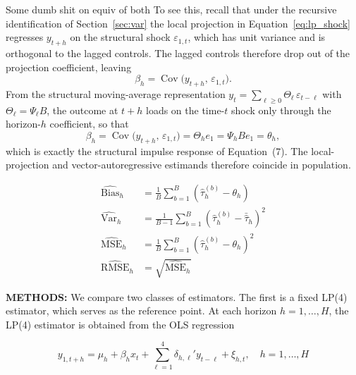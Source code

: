 Some dumb shit on equiv of both
To see this, recall that under the recursive identification of 
Section~\ref{sec:var} the local projection in Equation~\eqref{eq:lp_shock} regresses 
$y_{t+h}$ on the structural shock $\varepsilon_{1,t}$, which has unit variance and is 
orthogonal to the lagged controls. The lagged controls therefore drop out of the 
projection coefficient, leaving
\begin{equation}
\beta_h = \operatorname{Cov}\!\big(y_{t+h},\, \varepsilon_{1,t}\big).
\end{equation}
From the structural moving-average representation 
$y_t = \sum_{\ell \geq 0}\Theta_\ell\,\varepsilon_{t-\ell}$ with 
$\Theta_\ell = \Psi_\ell B$, the outcome at $t+h$ loads on the time-$t$ shock only 
through the horizon-$h$ coefficient, so that
\begin{equation}
\beta_h = \operatorname{Cov}\!\big(y_{t+h},\, \varepsilon_{1,t}\big) 
        = \Theta_h e_1 = \Psi_h B e_1 = \theta_h,
\end{equation}
which is exactly the structural impulse response of Equation~(7). The 
local-projection and vector-autoregressive estimands therefore coincide in 
population.




\begin{align}
    \widehat{\mathrm{Bias}}_h &= \frac{1}{B} \sum_{b=1}^{B} 
    \left(\hat{\tau}_h^{(b)} - \theta_h\right) \\
    \widehat{\mathrm{Var}}_h &= \frac{1}{B-1} \sum_{b=1}^{B} 
    \left(\hat{\tau}_h^{(b)} - \bar{\hat{\tau}}_h\right)^2 \\
    \widehat{\mathrm{MSE}}_h &= \frac{1}{B} \sum_{b=1}^{B} 
    \left(\hat{\tau}_h^{(b)} - \theta_h\right)^2 \\
    \widehat{\mathrm{RMSE}}_h &= \sqrt{\widehat{\mathrm{MSE}}_h}
\end{align}


\textbf{METHODS:} We compare two classes of estimators. The first is a fixed 
LP(4) estimator, which serves as the reference point. At each horizon 
$h = 1, \ldots, H$, the LP(4) estimator is obtained from the OLS regression

\begin{equation}
    y_{1,t+h} = \mu_h + \beta_h x_t + \sum_{\ell=1}^{4} \delta_{h,\ell}' 
    y_{t-\ell} + \xi_{h,t}, \quad h = 1, \ldots, H
\end{equation}

